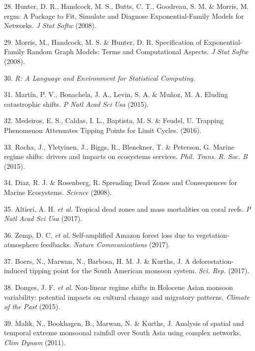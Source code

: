 \documentclass[9pt,]{article}
\begin{document}
\hypertarget{ref-Hunter:2008vh}{}
28. Hunter, D. R., Handcock, M. S., Butts, C. T., Goodreau, S. M. \&
Morris, M. ergm: A Package to Fit, Simulate and Diagnose
Exponential-Family Models for Networks. \emph{J Stat Softw} (2008).

\hypertarget{ref-Morris:2008ty}{}
29. Morris, M., Handcock, M. S. \& Hunter, D. R. Specification of
Exponential-Family Random Graph Models: Terms and Computational Aspects.
\emph{J Stat Softw} (2008).

\hypertarget{ref-RCoreTeam:2012wf}{}
30. \emph{R: A Language and Environment for Statistical Computing}.

\hypertarget{ref-Martin:2015kl}{}
31. Martín, P. V., Bonachela, J. A., Levin, S. A. \& Muñoz, M. A.
Eluding catastrophic shifts. \emph{P Natl Acad Sci Usa} (2015).

\hypertarget{ref-Medeiros:2016vf}{}
32. Medeiros, E. S., Caldas, I. L., Baptista, M. S. \& Feudel, U.
Trapping Phenomenon Attenuates Tipping Points for Limit Cycles. (2016).

\hypertarget{ref-Rocha:2015eea}{}
33. Rocha, J., Yletyinen, J., Biggs, R., Blenckner, T. \& Peterson, G.
Marine regime shifts: drivers and impacts on ecosystems services.
\emph{Phil. Trans. R. Soc. B} (2015).

\hypertarget{ref-Diaz:2008p199}{}
34. Diaz, R. J. \& Rosenberg, R. Spreading Dead Zones and Consequences
for Marine Ecosystems. \emph{Science} (2008).

\hypertarget{ref-Altieri:2017bl}{}
35. Altieri, A. H. \emph{et al.} Tropical dead zones and mass
mortalities on coral reefs. \emph{P Natl Acad Sci Usa} (2017).

\hypertarget{ref-Zemp:2017dr}{}
36. Zemp, D. C. \emph{et al.} Self-amplified Amazon forest loss due to
vegetation-atmosphere feedbacks. \emph{Nature Communications} (2017).

\hypertarget{ref-Boers:2017ej}{}
37. Boers, N., Marwan, N., Barbosa, H. M. J. \& Kurths, J. A
deforestation-induced tipping point for the South American monsoon
system. \emph{Sci. Rep.} (2017).

\hypertarget{ref-Donges:2015fv}{}
38. Donges, J. F. \emph{et al.} Non-linear regime shifts in Holocene
Asian monsoon variability: potential impacts on cultural change and
migratory patterns. \emph{Climate of the Past} (2015).

\hypertarget{ref-Malik:2011bv}{}
39. Malik, N., Bookhagen, B., Marwan, N. \& Kurths, J. Analysis of
spatial and temporal extreme monsoonal rainfall over South Asia using
complex networks. \emph{Clim Dynam} (2011).
\end{document}
